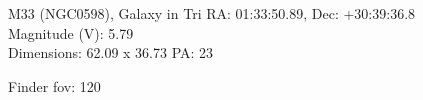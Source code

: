 \begin{block}{M33 (NGC0598), Galaxy in Tri}
    RA: 01:33:50.89, Dec: +30:39:36.8 \\ 
    Magnitude (V): 5.79 \\ 
    Dimensions: 62.09 x 36.73 PA: 23 

    Finder fov: 120 
\end{block}